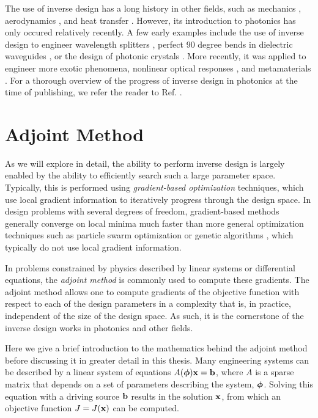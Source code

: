 The use of inverse design has a long history in other fields, such as mechanics \cite{tanaka_inverse_1998}, aerodynamics \cite{jameson_aerodynamic_nodate}, and heat transfer \cite{ozisik_inverse_2018}.
However, its introduction to photonics has only occured relatively recently.
A few early examples include the use of inverse design to engineer wavelength splitters \cite{piggott_inverse_2015}, perfect 90 degree bends in dielectric waveguides \cite{jensen_topology_2005}, or the design of photonic crystals \cite{borel_topology_2004}.
More recently, it was applied to engineer more exotic phenomena, nonlinear optical responses \cite{lin_cavity-enhanced_2016}, and metamaterials \cite{sigmund_systematic_2009}.
For a thorough overview of the progress of inverse design in photonics at the time of publishing, we refer the reader to Ref. .

\section{Adjoint Method}

As we will explore in detail, the ability to perform inverse design is largely enabled by the ability to efficiently search such a large parameter space.
Typically, this is performed using \textit{gradient-based optimization} techniques, which use local gradient information to iteratively progress through the design space.
In design problems with several degrees of freedom, gradient-based methods generally converge on local minima much faster than more general optimization techniques such as particle swarm optimization \cite{noauthor_particle_nodate} or genetic algorithms \cite{whitley_genetic_1994}, which typically do not use local gradient information.

In problems constrained by physics described by linear systems or differential equations, the \textit{adjoint method} is commonly used to compute these gradients.
The adjoint method allows one to compute gradients of the objective function with respect to each of the design parameters in a complexity that is, in practice, independent of the size of the design space.
As such, it is the cornerstone of the inverse design works in photonics and other fields.

Here we give a brief introduction to the mathematics behind the adjoint method before discussing it in greater detail in this thesis.
Many engineering systems can be described by a linear system of equations $A(\bm{\phi}) \mathbf{x} = \mathbf{b}$, where $A$ is a sparse matrix that depends on a set of parameters describing the system, $\bm{\phi}$.
Solving this equation with a driving source $\mathbf{b}$ results in the solution $\mathbf{x}$, from which an objective function $J=J(\mathbf{x})$ can be computed.

